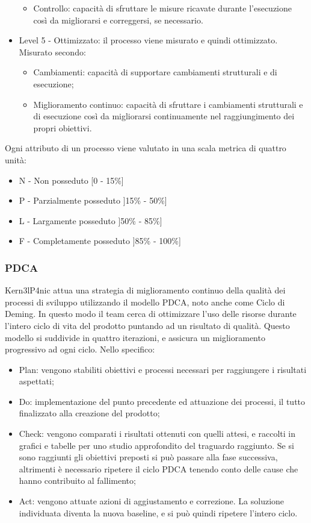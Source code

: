 \documentclass[../PianoDiQualifica.tex]{subfiles}
\begin{document}
\begin{itemize}
\begin{itemize}
					\item Controllo: capacità di sfruttare le misure ricavate durante l'esecuzione così da migliorarsi e correggersi, se necessario.
				\end{itemize}
			\item Level 5 - Ottimizzato: il processo viene misurato e quindi ottimizzato.
			Misurato secondo:
				\begin{itemize}
					\item Cambiamenti: capacità di supportare cambiamenti strutturali e di esecuzione;
					\item Miglioramento continuo: capacità di sfruttare i cambiamenti strutturali e di esecuzione così da migliorarsi continuamente nel raggiungimento dei propri obiettivi.
				\end{itemize}
			\end{itemize}
			Ogni attributo di un processo viene valutato in una scala metrica di quattro unità:
			\begin{itemize}
				\item N - Non posseduto [0 - 15\%]
				\item P - Parzialmente posseduto ]15\% - 50\%]
				\item L - Largamente posseduto ]50\% - 85\%]
				\item F - Completamente posseduto ]85\% - 100\%]
			\end{itemize}		
			\subsubsection{PDCA}
			Kern3lP4nic attua una strategia di miglioramento continuo della qualità dei processi di sviluppo utilizzando il modello PDCA, noto anche come Ciclo di Deming. In questo modo il team cerca di ottimizzare l'uso delle risorse durante l'intero ciclo di vita del prodotto puntando ad un risultato di qualità. Questo modello si suddivide in quattro iterazioni, e assicura un miglioramento progressivo ad ogni ciclo. Nello specifico: 
			\begin{itemize}
				\item Plan: vengono stabiliti obiettivi e processi necessari per raggiungere i risultati aspettati;
				\item Do: implementazione del punto precedente ed attuazione dei processi, il tutto finalizzato alla creazione del prodotto;
				\item Check: vengono comparati i risultati ottenuti con quelli attesi, e raccolti in grafici e tabelle per uno studio approfondito del traguardo raggiunto. Se si sono raggiunti gli obiettivi preposti si può passare alla fase successiva, altrimenti è necessario ripetere il ciclo PDCA tenendo conto delle cause che hanno contribuito al fallimento;
				\item Act: vengono attuate azioni di aggiustamento e correzione. La soluzione individuata diventa la nuova baseline, e si può quindi ripetere l'intero ciclo.
			\end{itemize}
\end{document}
